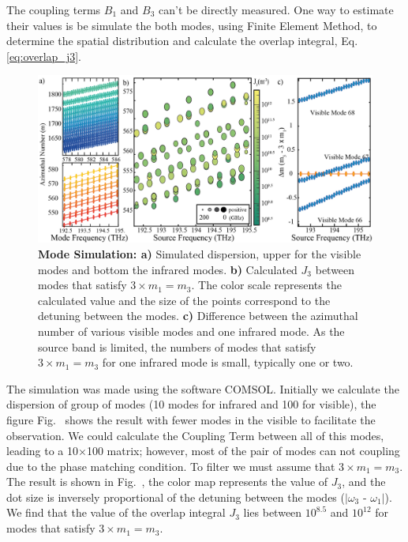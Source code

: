 The coupling terms $B_1$ and $B_3$ can't be directly measured. One way to estimate their values is be simulate the both modes, using Finite Element Method, to determine the spatial distribution and calculate the overlap integral, Eq.\ref{eq:overlap_j3}.

\begin{figure}[t]
    \centering
    \includegraphics[width = 16cm]{figuras/Dissertation_j3_simulation.jpg}
    \caption{\textbf{Mode Simulation: a)} Simulated dispersion, upper for the visible modes and bottom the infrared modes. \textbf{b)} Calculated $J_3$ between modes that satisfy $3\times m_1 = m_3$. The color scale represents the calculated value and the size of the points correspond to the detuning between the modes. \textbf{c)} Difference between the azimuthal number of various visible modes and one infrared mode. As the source band is limited, the numbers of modes that satisfy $3\times m_1 = m_3$ for one infrared mode is small, typically one or two. }
    \label{fig:j3_sim}
\end{figure}

The simulation was made using the software COMSOL\regmark. Initially we calculate the dispersion of group of modes (10 modes for infrared and 100 for visible), the figure Fig.~ shows the result  with fewer modes in the visible to facilitate the observation. We could calculate the Coupling Term between all of this modes, leading to a 10$\times$100 matrix; however, most of the pair of modes can not coupling due to the phase matching condition. To filter we must assume that $3\times m_1 = m_3$. The result is shown in Fig.~, the color map represents the value of $J_3$, and the dot size is inversely proportional of the detuning between the modes ($|\omega_3$ - $\omega_1|$). We find that the value of the overlap integral $J_3$ lies between $10^{8.5}$ and $10^{12}$ for modes that satisfy $3\times m_1 = m_3$. 

